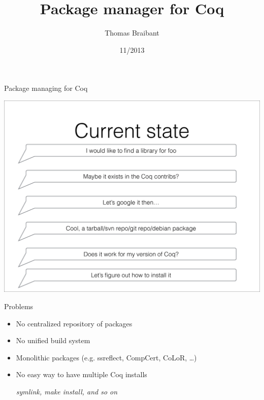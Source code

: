 \documentclass[9pt]{beamer}
\title{Package manager for Coq}
\author{Thomas Braibant}
\institute[Inria]{Inria}
\date[11/2013]{11/2013}
\newcommand{\redemph}[1]{\alert{\emph{#1}}}
\begin{document}
\newcommand \orange[1]{{\color{orange}{#1}}}

\newcommand\parenthesis[1] {
  \begin{flushright}
    {\scriptsize \redemph{{{{ #1}}}}}
  \end{flushright}

}

\newcommand\plan[2]
{
\begin{frame}[plain]
  \begin{center}
    {\Huge  \sc #1} \\

    \vspace{1cm}

    #2
\end{center}
\end{frame}
}

\plan{Package managing for Coq}{}

\begin{frame}[plain]
  \includegraphics[width=\linewidth]{figs/current-state.pdf}
\end{frame}

\begin{frame}{Problems}
  \begin{itemize}
  \item No centralized repository of packages
  \item No unified build system
  \item Monolithic packages (e.g. ssreflect, CompCert, CoLoR, \dots)
  \item No easy way to have multiple Coq installs \\
    \parenthesis{symlink, make install, and so on}
  \end{itemize}
\end{frame}
\end{document}
